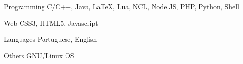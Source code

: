 

\begin{cvskills}

  \cvskill
    {Programming} %
    {C/C++, Java, LaTeX, Lua, NCL, Node.JS, PHP, Python, Shell} %

  \cvskill
    {Web} %
    {CSS3, HTML5, Javascript} %

  \cvskill
    {Languages} %
    {Portuguese, English} %

  \cvskill
    {Others} %
    {GNU/Linux OS} %

\end{cvskills}
